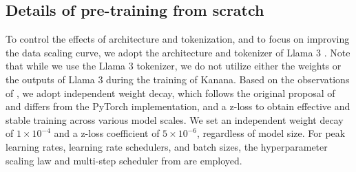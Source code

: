 \clearpage
\subsection{Details of pre-training from scratch}\label{appendix:pretrain-details}

To control the effects of architecture and tokenization, and to focus on improving the data scaling curve, we adopt the architecture and tokenizer of Llama 3 \citep{llama3}.
Note that while we use the Llama 3 tokenizer, we do not utilize either the weights or the outputs of Llama 3 during the training of Kanana.
Based on the observations of \citet{small-scale-proxy}, we adopt independent weight decay, which follows the original proposal of \citet{adamw} and differs from the PyTorch implementation, and a z-loss \citep{palm} to obtain effective and stable training across various model scales.
We set an independent weight decay of $1\times10^{-4}$ and a z-loss coefficient of $5 \times 10^{-6}$, regardless of model size.
For peak learning rates, learning rate schedulers, and batch sizes, the hyperparameter scaling law and multi-step scheduler from \citet{deepseek-llm} are employed.